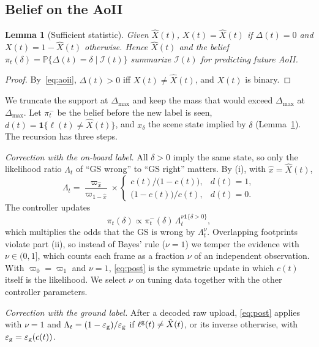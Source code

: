 \documentclass[conference]{IEEEtran}
\newtheorem{lemma}{Lemma}
\theoremstyle{remark}
\newcommand{\Prob}{\mathbb{P}}
\newcommand{\ind}[1]{\mathbf{1}\{#1\}}
\newcommand{\I}{\mathcal{I}}
\newcommand{\lab}{\ell}
\newcommand{\ee}{\varepsilon}
\newcommand{\xh}{\hat{x}}
\begin{document}
\subsection{Belief on the AoII}\label{sec:belief}
\begin{lemma}[Sufficient statistic]\label{lem:suff}
Given $\hat X(t)$, $X(t)=\hat X(t)$ if $\Delta(t)=0$ and $X(t)=1-\hat X(t)$ otherwise. Hence $\hat X(t)$ and the belief $\pi_t(\delta)=\Prob\{\Delta(t)=\delta\mid\I(t)\}$ summarize $\I(t)$ for predicting future AoII.
\end{lemma}
\begin{proof}
By~\eqref{eq:aoii}, $\Delta(t)>0$ iff $X(t)\neq\hat X(t)$, and $X(t)$ is binary.
\end{proof}

We truncate the support at $\Delta_{\max}$ and keep the mass that would exceed $\Delta_{\max}$ at $\Delta_{\max}$. Let $\pi^-_t$ be the belief before the new label is seen, $d(t)=\ind{\lab(t)\neq\hat X(t)}$, and $x_\delta$ the scene state implied by $\delta$ (Lemma~\ref{lem:suff}). The recursion has three steps.

\emph{Correction with the on-board label.} All $\delta>0$ imply the same state, so only the likelihood ratio $\Lambda_t$ of ``GS wrong'' to ``GS right'' matters. By (i), with $\xh=\hat X(t)$,
\begin{equation}\label{eq:Lambda}
\Lambda_t=\frac{\varpi_{\xh}}{\varpi_{1-\xh}}\times\begin{cases}c(t)/\big(1-c(t)\big), & d(t)=1,\\ \big(1-c(t)\big)/c(t), & d(t)=0.\end{cases}
\end{equation} The controller updates
\begin{equation}\label{eq:post}
\pi_t(\delta)\propto\pi^-_t(\delta)\,\Lambda_t^{\nu\ind{\delta>0}},
\end{equation}
which multiplies the odds that the GS is wrong by $\Lambda_t^{\nu}$. Overlapping footprints violate part (ii), so instead of Bayes' rule ($\nu=1$) we temper the evidence with $\nu\in(0,1]$, which counts each frame as a fraction $\nu$ of an independent observation. With $\varpi_0=\varpi_1$ and $\nu=1$, \eqref{eq:post} is the symmetric update in which $c(t)$ itself is the likelihood. We select $\nu$ on tuning data together with the other controller parameters.

\emph{Correction with the ground label.} After a decoded raw upload, \eqref{eq:post} applies with $\nu=1$ and $\Lambda_t=(1-\ee_{\rm g})/\ee_{\rm g}$ if $\lab^{\rm g}(t)\neq\hat X(t)$, or its inverse otherwise, with $\ee_{\rm g}=\ee_{\rm g}(c(t))$.
\end{document}
